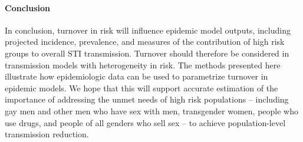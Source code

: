 \paragraph{Conclusion}
In conclusion, turnover in risk will influence
epidemic model outputs, including projected incidence, prevalence, and
measures of the contribution of high risk groups to overall STI transmission.
Turnover should therefore be considered in
transmission models with heterogeneity in risk.
The methods presented here illustrate how
epidemiologic data can be used to parametrize
turnover in epidemic models.
We hope that this will support accurate estimation of
the importance of addressing the unmet needs of high risk populations
-- including
gay men and other men who have sex with men,
transgender women,
people who use drugs, and
people of all genders who sell sex
-- to achieve population-level transmission reduction.